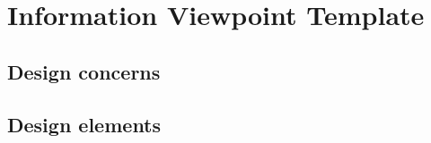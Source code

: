 \chapter{Information Viewpoint Template} \label{chp:information-viewpoint-template}
	\begin{comment}
		The Information viewpoint is applicable when there is a substantial persistent data content expected with
		the design subject.
	\end{comment}
	
	\section{Design concerns} \label{s:information-viewpoint-template:design-concerns}
		\begin{comment}
			Key concerns include persistent data structure, data content, data management strategies, data access
			schemes, and definition of metadata.
		\end{comment}
	
	\section{Design elements} \label{s:information-viewpoint-template:design-elements}
		\begin{comment}
			Design entities: data items, data types and classes, data stores, and access mechanisms.
			
			Design relationships: association, uses, implements. Data attributes, their constraints and static
			relationships among data entities, aggregates of attributes, and relationships.
			
			Design attributes: persistence and quality properties.
		\end{comment}
	

